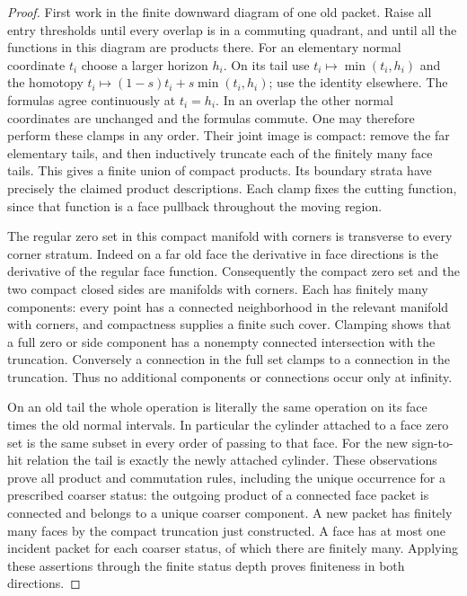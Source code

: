 \begin{proof}
First work in the finite downward diagram of one old packet.  Raise
all entry thresholds until every overlap is in a commuting quadrant,
and until all the functions in this diagram are products there.
For an elementary normal coordinate $t_i$ choose a larger horizon $h_i$.
On its tail use
$t_i\mapsto\min(t_i,h_i)$ and the homotopy
$t_i\mapsto(1-s)t_i+s\min(t_i,h_i)$; use the identity elsewhere.
The formulas agree continuously at $t_i=h_i$.  In an overlap the
other normal coordinates are unchanged and the formulas commute.
One may therefore perform these clamps in any order.  Their joint image
is compact: remove the far elementary tails, and then inductively
truncate each of the finitely many face tails.  This gives a finite
union of compact products.  Its boundary strata have precisely the
claimed product descriptions.  Each clamp fixes the cutting function,
since that function is a face pullback throughout the moving region.

The regular zero set in this compact manifold with corners is transverse
to every corner stratum.  Indeed on a far old face the derivative in
face directions is the derivative of the regular face function.
Consequently the compact zero set and the two compact closed sides are
manifolds with corners.  Each has finitely many components: every point
has a connected neighborhood in the relevant manifold with corners,
and compactness supplies a finite such cover.  Clamping shows that a
full zero or side component has a nonempty connected intersection with
the truncation.  Conversely a connection in the full set clamps to a
connection in the truncation.  Thus no additional components or
connections occur only at infinity.

On an old tail the whole operation is literally the same operation on
its face times the old normal intervals.  In particular the cylinder
attached to a face zero set is the same subset in every order of
passing to that face.  For the new sign-to-hit relation the tail is
exactly the newly attached cylinder.  These observations prove all
product and commutation rules, including the unique occurrence for
a prescribed coarser status: the outgoing product of a connected face
packet is connected and belongs to a unique coarser component.
A new packet has finitely many faces by the compact truncation just
constructed.  A face has at most one incident packet for each coarser
status, of which there are finitely many.  Applying these assertions
through the finite status depth proves finiteness in both directions.


\end{proof}

